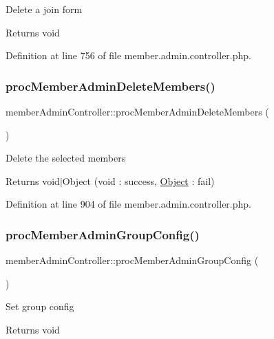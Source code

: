 Delete a join form \begin{DoxyReturn}{Returns}
void 
\end{DoxyReturn}


Definition at line 756 of file member.\+admin.\+controller.\+php.

\mbox{\label{classmemberAdminController_a1c84f5c32acd6c0fada7806c179108df}} 
\subsubsection{\texorpdfstring{proc\+Member\+Admin\+Delete\+Members()}{procMemberAdminDeleteMembers()}}
{\footnotesize\ttfamily member\+Admin\+Controller\+::proc\+Member\+Admin\+Delete\+Members (\begin{DoxyParamCaption}{ }\end{DoxyParamCaption})}

Delete the selected members \begin{DoxyReturn}{Returns}
void$\vert$\+Object (void \+: success, \hyperlink{classObject}{Object} \+: fail) 
\end{DoxyReturn}


Definition at line 904 of file member.\+admin.\+controller.\+php.

\mbox{\label{classmemberAdminController_a3f05ea4475dfc91d5252ed38d2cac10a}} 
\subsubsection{\texorpdfstring{proc\+Member\+Admin\+Group\+Config()}{procMemberAdminGroupConfig()}}
{\footnotesize\ttfamily member\+Admin\+Controller\+::proc\+Member\+Admin\+Group\+Config (\begin{DoxyParamCaption}{ }\end{DoxyParamCaption})}

Set group config \begin{DoxyReturn}{Returns}
void 
\end{DoxyReturn}


